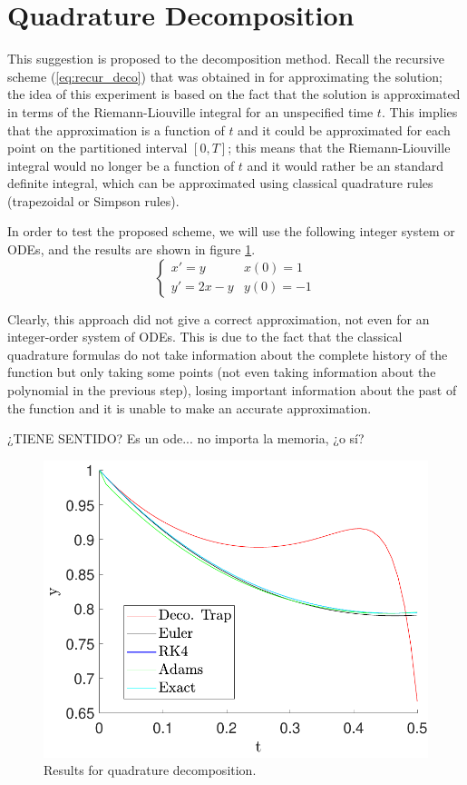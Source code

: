 \section{Quadrature Decomposition}
This suggestion is proposed to the decomposition method. Recall the recursive scheme (\ref{eq:recur_deco}) that was obtained in for approximating the solution; the idea of this experiment is based on the fact that the solution is approximated in terms of the Riemann-Liouville integral for an unspecified time $t$. This implies that the approximation is a function of $t$ and it could be approximated for each point on the partitioned interval $[0,T]$; this means that the Riemann-Liouville integral would no longer be a function of $t$ and it would rather be an standard definite integral, which can be approximated using classical quadrature rules (trapezoidal or Simpson rules).

In order to test the proposed scheme, we will use the following integer system or ODEs, and the results are shown in figure \ref{fig:qDeco_ex}.
\begin{equation}
  \begin{cases}
    x'=y&x(0)=1\\
    y'=2x-y&y(0)=-1
  \end{cases}
\end{equation}

Clearly, this approach did not give a correct approximation, not even for an integer-order system of ODEs. This is due to the fact that the classical quadrature formulas do not take information about the complete history of the function but only taking some points (not even taking information about the polynomial in the previous step), losing important information about the past of the function and it is unable to make an accurate approximation. 

¿TIENE SENTIDO? Es un ode... no importa la memoria, ¿o sí?

\begin{figure}[H]
  \centering
  \includegraphics[scale=.5]{files/decom_trap.pdf}
  \caption{Results for quadrature decomposition.}
  \label{fig:qDeco_ex}
\end{figure}
